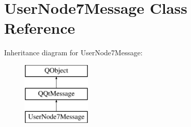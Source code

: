 \hypertarget{class_user_node7_message}{}\section{User\+Node7\+Message Class Reference}
\label{class_user_node7_message}
Inheritance diagram for User\+Node7\+Message\+:\begin{figure}[H]
\begin{center}
\leavevmode
\includegraphics[height=3.000000cm]{class_user_node7_message}
\end{center}
\end{figure}

